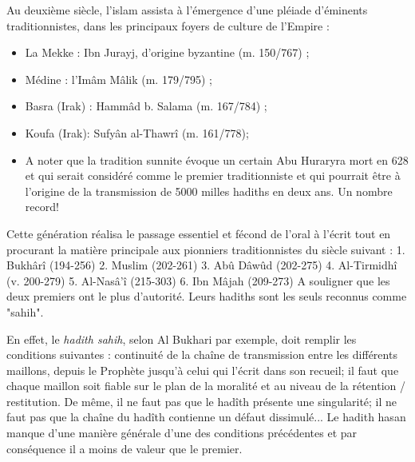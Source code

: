 Au deuxième siècle, l'islam assista à l’émergence d’une pléiade d’éminents traditionnistes, dans les principaux foyers de culture de l’Empire :
\begin{itemize}
    \item La Mekke : Ibn Jurayj, d’origine byzantine (m. 150/767) ;
\item 	Médine : l’Imâm Mâlik (m. 179/795) ;
\item 	Basra (Irak) : Hammâd b. Salama (m. 167/784) ;
\item 	Koufa (Irak): Sufyân al-Thawrî (m. 161/778);

\item 	A noter que la tradition sunnite évoque un certain Abu Huraryra mort en 628 et qui serait considéré comme le premier traditionniste et qui pourrait être à l'origine de la transmission de 5000 milles hadiths en deux ans.  Un nombre record!
\end{itemize}

Cette génération réalisa le passage essentiel et fécond de l'oral à l'écrit tout en procurant la matière principale aux  pionniers traditionnistes du siècle suivant :
1. Bukhârî (194-256)
2. Muslim (202-261)	
3. Abû Dâwûd (202-275)	
	4. Al-Tirmidhî (v. 200-279)
	5. Al-Nasâ'î (215-303)
	6. Ibn Mâjah (209-273)
A souligner que les deux premiers ont le plus d'autorité. Leurs hadiths sont les seuls reconnus comme "sahih". 

En effet, le \textit{hadith sahih}, selon Al Bukhari par exemple, doit remplir les conditions suivantes : continuité de la chaîne de transmission entre les différents maillons, depuis le Prophète jusqu'à celui qui l'écrit dans son recueil; il faut que chaque maillon soit fiable sur le plan de la moralité 
et au niveau de la rétention / restitution. De même, il ne faut pas que le hadîth présente une singularité; il ne faut pas que la chaîne du hadîth contienne un défaut dissimulé...
Le hadith hasan manque d'une manière générale d'une des conditions précédentes et par conséquence il a moins de valeur que le premier.




